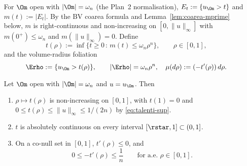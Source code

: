 \begin{definition}
\label{def:t-rho}
For $\Om$ open with $|\Om|=\omega_n$ (the Plan~2 normalisation),
$E_t:=\{u_\Om>t\}$ and $m(t):=|E_t|$. By the BV coarea formula and
Lemma~\ref{lem:coarea-mprime} below, $m$ is right-continuous and
non-increasing on $[0,\|u\|_\infty]$ with $m(0^+)\le\omega_n$ and
$m(\|u\|_\infty)=0$. Define
\begin{equation}\label{eq:trho}
   t(\rho):=\inf\bigl\{t\ge 0\,:\,m(t)\le\omega_n\rho^n\bigr\},
   \qquad\rho\in[0,1],
\end{equation}
and the volume-radius foliation
\begin{equation}\label{eq:Erho}
   \Erho:=\{u_\Om>t(\rho)\},\qquad
   |\Erho|=\omega_n\rho^n,\quad
   \mu(d\rho):=(-t'(\rho))\,d\rho.
\end{equation}
\end{definition}

\begin{lemma}\label{lem:trho-props}
Let $\Om$ open with $|\Om|=\omega_n$ and $u=u_\Om$. Then
\begin{enumerate}
\item[(i)] $\rho\mapsto t(\rho)$ is non-increasing on $[0,1]$, with
$t(1)=0$ and $0\le t(\rho)\le\|u\|_\infty\le 1/(2n)$ by
\eqref{eq:talenti-sup}.
\item[(ii)] $t$ is absolutely continuous on every interval
$[\rstar,1]\subset(0,1]$.
\item[(iii)] On a co-null set in $[0,1]$,
$t'(\rho)\le 0$, and
\begin{equation}\label{eq:dt-bound}
   0\le -t'(\rho)\le\frac{1}{n}
   \qquad\text{for a.e.\ }\rho\in[0,1].
\end{equation}
\end{enumerate}
\end{lemma}

